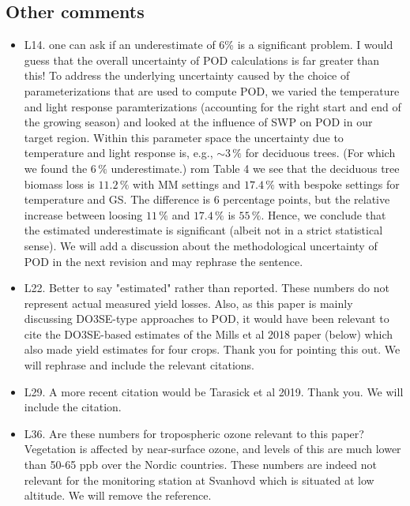 \documentclass{scrartcl}
\begin{document}
\subsection*{Other comments} 
\begin{itemize}

\item {\color{blue}L14. one can ask if an underestimate of 6\% is a significant problem. I would guess that the overall uncertainty of POD calculations is far greater than this!} To address the underlying uncertainty caused by the choice of parameterizations that are used to compute POD, we varied the temperature and light response paramterizations (accounting for the right start and end of the growing season) and looked at the influence of SWP on POD in our target region. Within this parameter space the uncertainty due to temperature and light response is, e.g., $\sim3\,\%$ for deciduous trees. (For which we found the $6\,\%$ underestimate.)
rom Table 4 we see that the deciduous tree biomass loss is $11.2\,\%$ with MM settings and $17.4\,\%$ with bespoke settings for temperature and GS. The difference is 6 percentage points, but the relative increase between loosing $11\,\%$ and $17.4\,\%$ is $55\,\%$.
Hence, we conclude that the estimated underestimate is significant (albeit not in a strict statistical sense). We will add a discussion about the methodological uncertainty of POD in the next revision and may rephrase the sentence.

\item {\color{blue}L22. Better to say "estimated" rather than reported. These numbers do not represent actual measured yield losses. Also, as this paper is mainly discussing DO3SE-type approaches to POD, it would have been relevant to cite the DO3SE-based estimates of the Mills et al 2018 paper (below) which also made yield estimates for four crops.} Thank you for pointing this out. We will rephrase and include the relevant citations.

\item {\color{blue}L29. A more recent citation would be Tarasick et al 2019.}
Thank you. We will include the citation.

\item {\color{blue}L36. Are these numbers for tropospheric ozone relevant to this paper? Vegetation is affected by near-surface ozone, and levels of this are much lower than 50-65 ppb over the Nordic countries.}
These numbers are indeed not relevant for the monitoring station at Svanhovd which is situated at low altitude. We will remove the reference.


\end{itemize}
\end{document}

